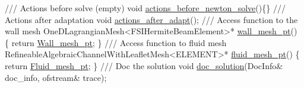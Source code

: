 \begin{DoxyCodeInclude}
\textcolor{comment}{}
\textcolor{comment}{ /// Actions before solve (empty) }
\textcolor{comment}{} \textcolor{keywordtype}{void} \hyperlink{classFSIChannelWithLeafletProblem_a8a32ef77f32b3283b4b509669deb0a11}{actions\_before\_newton\_solve}()\{\}
\textcolor{comment}{}
\textcolor{comment}{ /// Actions after adaptation}
\textcolor{comment}{} \textcolor{keywordtype}{void} \hyperlink{classFSIChannelWithLeafletProblem_acc3f4745ea9b4524aebbc4f2556d1286}{actions\_after\_adapt}();
\textcolor{comment}{}
\textcolor{comment}{ /// Access function to the wall mesh}
\textcolor{comment}{} OneDLagrangianMesh<FSIHermiteBeamElement>* \hyperlink{classFSIChannelWithLeafletProblem_ab6a1c532882a71ddd576c752da389de0}{wall\_mesh\_pt}() 
  \{
   \textcolor{keywordflow}{return} \hyperlink{classFSIChannelWithLeafletProblem_a943437726f0a54fa8f7fc9ffb12bc4cd}{Wall\_mesh\_pt};
  \} 
\textcolor{comment}{}
\textcolor{comment}{ /// Access function to fluid mesh}
\textcolor{comment}{} RefineableAlgebraicChannelWithLeafletMesh<ELEMENT>* \hyperlink{classFSIChannelWithLeafletProblem_aec9244497829f9a85cbca7307c4d4e10}{fluid\_mesh\_pt}()
  \{
   \textcolor{keywordflow}{return} \hyperlink{classFSIChannelWithLeafletProblem_a40cee3652918bdcf67569afc89d3074d}{Fluid\_mesh\_pt};
  \}
\textcolor{comment}{}
\textcolor{comment}{ /// Doc the solution}
\textcolor{comment}{} \textcolor{keywordtype}{void} \hyperlink{classFSIChannelWithLeafletProblem_a055f124f38dca43bc3ed36b80c5c0880}{doc\_solution}(DocInfo& doc\_info, ofstream& trace);

\end{DoxyCodeInclude}


